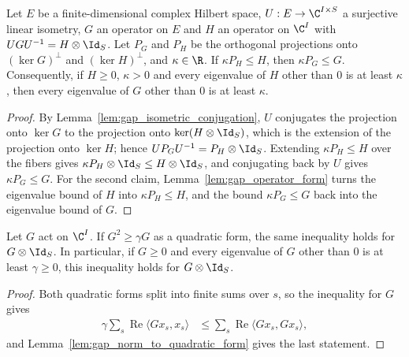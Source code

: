 \begin{lemma}
    \label{lem:perturbations_fiberwise_conjugate_gap}
    \leanok
    Let $E$ be a finite-dimensional complex Hilbert space, $U:E\to\C^{I\times S}$ a
    surjective linear isometry, $G$ an operator on $E$ and $H$ an operator on $\C^I$ with
    $UGU^{-1}=H\otimes\Id_S$. Let $P_G$ and $P_H$ be the orthogonal projections onto
    $(\ker G)^\perp$ and $(\ker H)^\perp$, and $\kappa\in\R$. If $\kappa P_H\le H$,
    then $\kappa P_G\le G$. Consequently, if $H\ge0$, $\kappa>0$ and every eigenvalue
    of $H$ other than $0$ is at least $\kappa$, then every eigenvalue of $G$ other than
    $0$ is at least $\kappa$.
\end{lemma}
\begin{proof}
    \leanok
    By Lemma~\ref{lem:gap_isometric_conjugation}, $U$ conjugates the projection onto
    $\ker G$ to the projection onto $\ker(H\otimes\Id_S)$, which is the extension of
    the projection onto $\ker H$; hence $UP_GU^{-1}=P_H\otimes\Id_S$. Extending
    $\kappa P_H\le H$ over the fibers gives $\kappa P_H\otimes\Id_S\le H\otimes\Id_S$,
    and conjugating back by $U$ gives $\kappa P_G\le G$. For the second claim,
    Lemma~\ref{lem:gap_operator_form} turns the eigenvalue bound of $H$ into
    $\kappa P_H\le H$, and the bound $\kappa P_G\le G$ back into the eigenvalue
    bound of $G$.
\end{proof}

\begin{lemma}
    \label{lem:right_spectator_quadratic_form_gap}
    \leanok
    Let $G$ act on $\C^I$. If $G^2\geq\gamma G$ as a quadratic form, the same
    inequality holds for $G\otimes\Id_S$. In particular, if $G\ge0$ and every
    eigenvalue of $G$ other than $0$ is at least $\gamma\ge0$, this inequality holds
    for $G\otimes\Id_S$.
\end{lemma}
\begin{proof}
    \leanok
    Both quadratic forms split into finite sums over $s$, so the inequality
    for $G$ gives
    \begin{align}
        \gamma\sum_s\operatorname{Re}\langle Gx_s,x_s\rangle
         & \leq \sum_s\operatorname{Re}\langle Gx_s,Gx_s\rangle,
    \end{align}
    and Lemma~\ref{lem:gap_norm_to_quadratic_form} gives the last statement.
\end{proof}

